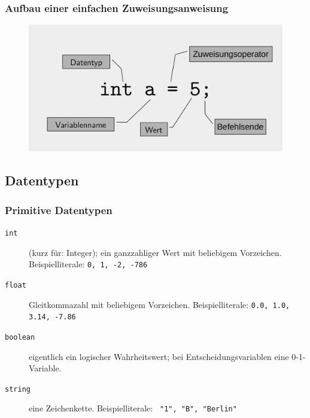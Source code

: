 \begin{frame}
 \frametitle{Aufbau einer einfachen Zuweisungsanweisung}
 \begin{figure}
  \centering
  \includegraphics[width=\linewidth]{Bilder/OPL-Anweisung}
 \end{figure}
\end{frame}

\subsection{Datentypen}
\begin{frame}
 \frametitle{Primitive Datentypen}
 \begin{description}
  \item[\texttt{int}] (kurz für: \glqq Integer\grqq); ein ganzzahliger Wert mit beliebigem Vorzeichen. 
  Beispielliterale: \texttt{0, 1, -2, -786}
  \item[\texttt{float}] Gleitkommazahl mit beliebigem Vorzeichen. 
  Beispielliterale: \texttt{0.0, 1.0, 3.14, -7.86}
  \item[\texttt{boolean}] eigentlich ein logischer Wahrheitswert; bei Entscheidungsvariablen eine 0-1-Variable.
  \item[\texttt{string}] eine Zeichenkette. Beispielliterale: 
  \texttt{ "1", "B", "Berlin"}
 \end{description}
\end{frame}


